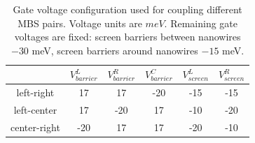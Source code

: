 \begin{table}[h!]
\centering
\begin{tabular}{||c ||c c c c c ||} 
 \hline
&  $V_{barrier}^L$ & $V_{barrier}^R$ & $V_{barrier}^C$ & $V_{screen}^L$ & $V_{screen}^R$ \\
 \hline\hline
 left-right & 17 & 17 & -20 & -15 & -15\\ 
 \hline
 left-center  & 17 & -20 & 17 & -10 & -20\\ 
 \hline
 center-right & -20 & 17 & 17 & -20 & -10\\ 
 \hline
 \hline
\end{tabular}
\caption{Gate voltage configuration used for coupling different MBS pairs. Voltage units are $meV$. Remaining gate voltages are fixed: screen barriers between nanowires $-30$ meV, screen barriers around nanowires $-15$ meV.}
\label{table:gate_voltages_2}
\end{table}



